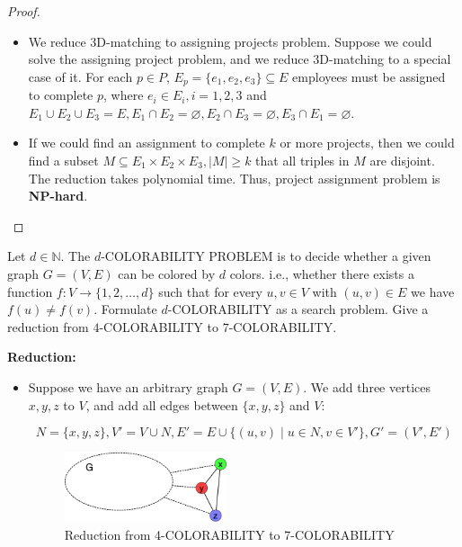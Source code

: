 \documentclass{article}
\newcounter{exercise}
\newcommand{\<}{
    \langle}
\renewcommand{\>}{
    \rangle}
\begin{document}
{\begin{proof}
\begin{itemize}
        \item We reduce 3D-matching to assigning projects problem. Suppose we could solve the assigning project problem, and we reduce 3D-matching to a special case of it. For each $p\in P$, $E_p=\{e_1,e_2,e_3\}\subseteq E$ employees must be assigned to complete $p$, where $e_i\in E_i,i=1,2,3$ and $E_1\cup E_2\cup E_3=E,E_1\cap E_2=\varnothing,E_2\cap E_3=\varnothing,E_3\cap E_1=\varnothing$.
        \item If we could find an assignment to complete $k$ or more projects, then we could find a subset $M\subseteq E_1\times E_2\times E_3,|M|\geq k$ that all triples in $M$ are disjoint. The reduction takes polynomial time. Thus, project assignment problem is \textbf{NP-hard}.
    \end{itemize}
\end{proof}

\newpage

\begin{exercise}
Let $d\in \mathbb{N}$. The $d$-\textsf{COLORABILITY PROBLEM} is to decide whether a given graph $G=(V,E)$ can be colored by $d$ colors. i.e., whether there exists a function $f:V\rightarrow \{1,2,\ldots,d\}$ such that for every $u,v\in V$ with $(u,v)\in E$ we have $f(u)\neq f(v)$. Formulate  $d$-\textsf{COLORABILITY} as a search problem. Give a reduction from $4$-\textsc{COLORABILITY} to $7$-\textsc{COLORABILITY}.
\end{exercise}

\leavevmode\newline

\textbf{Reduction:} 
\begin{itemize}
\item Suppose we have an arbitrary graph $G=(V,E)$. We add three vertices $x,y,z$ to $V$, and add all edges between $\{x,y,z\}$ and $V$:

\begin{displaymath} 
    N=\{x,y,z\},V'=V\cup N, E'=E\cup \{(u,v)\mid u\in N, v \in V'\},G'=(V',E')
\end{displaymath}

\begin{figure}[!htp]
    \centering
    \includegraphics[width=0.45\textwidth]{img/6.jpg}
    \caption{Reduction from 4-COLORABILITY to 7-COLORABILITY}
    \label{ggg}
  \end{figure}


\end{itemize}}
\end{document}

